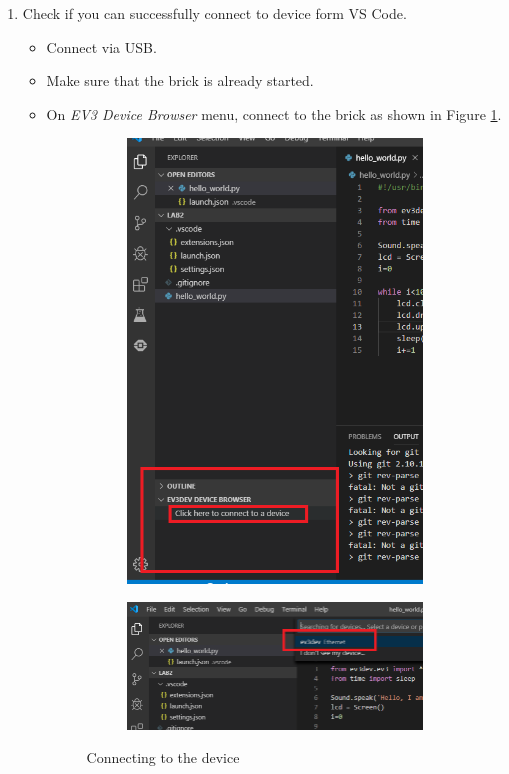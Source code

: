 \documentclass{scrartcl}
\begin{document}
\begin{enumerate}
\begin{lstlisting}
            Sound.speak('Hello, I am E V 3!').wait()
            lcd = Screen()
            i=0
            
            while i<20:
                lcd.clear()
                lcd.draw.text((20+i, 20+i), 'CMPE 434')
                lcd.update()
                sleep(0.05)
                i+=1
        \end{lstlisting}

    \item Check if you can successfully connect to device form VS Code.
        \begin{itemize}
            \item Connect via USB.
            \item Make sure that the brick is already started.
            \item On \textit{EV3 Device Browser} menu, connect to the brick as shown in Figure \ref{fig:con}.
                \begin{figure}
                    \centering
                    \begin{subfigure}{.5\textwidth}
                      \centering
                      \includegraphics[width=.5\linewidth]{1.jpg}
                    \end{subfigure}%
                    \begin{subfigure}{.5\textwidth}
                      \centering
                      \includegraphics[width=.85\linewidth]{2.jpg}
                    \end{subfigure}
                    \caption{Connecting to the device}
                    \label{fig:con}
                \end{figure}
        \end{itemize}


\end{enumerate}
\end{document}
